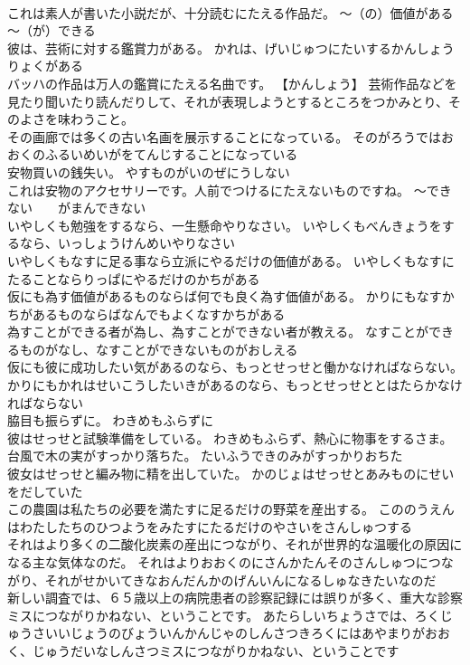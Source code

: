\documentclass[8pt]{extreport}
\begin{document}
\begin{CJK}{UTF8}{min}
\\	これは素人が書いた小説だが、十分読むにたえる作品だ。	～（の）価値がある　　～（が）できる
\\	彼は、芸術に対する鑑賞力がある。	かれは、げいじゅつにたいするかんしょうりょくがある 
\\	バッハの作品は万人の鑑賞にたえる名曲です。	【かんしょう】 芸術作品などを見たり聞いたり読んだりして、それが表現しようとするところをつかみとり、そのよさを味わうこと。
\\	その画廊では多くの古い名画を展示することになっている。	そのがろうではおおくのふるいめいがをてんじすることになっている 
\\	安物買いの銭失い。	やすものがいのぜにうしない 
\\	これは安物のアクセサリーです。人前でつけるにたえないものですね。	～できない　　がまんできない
\\	いやしくも勉強をするなら、一生懸命やりなさい。	いやしくもべんきょうをするなら、いっしょうけんめいやりなさい 
\\	いやしくもなすに足る事なら立派にやるだけの価値がある。	いやしくもなすにたることならりっぱにやるだけのかちがある 
\\	仮にも為す価値があるものならば何でも良く為す価値がある。	かりにもなすかちがあるものならばなんでもよくなすかちがある 
\\	為すことができる者が為し、為すことができない者が教える。	なすことができるものがなし、なすことができないものがおしえる 
\\	仮にも彼に成功したい気があるのなら、もっとせっせと働かなければならない。	かりにもかれはせいこうしたいきがあるのなら、もっとせっせととはたらかなければならない 
\\	脇目も振らずに。	わきめもふらずに 
\\	彼はせっせと試験準備をしている。	わきめもふらず、熱心に物事をするさま。
\\	台風で木の実がすっかり落ちた。	たいふうできのみがすっかりおちた 
\\	彼女はせっせと編み物に精を出していた。	かのじょはせっせとあみものにせいをだしていた 
\\	この農園は私たちの必要を満たすに足るだけの野菜を産出する。	こののうえんはわたしたちのひつようをみたすにたるだけのやさいをさんしゅつする 
\\	それはより多くの二酸化炭素の産出につながり、それが世界的な温暖化の原因になる主な気体なのだ。	それはよりおおくのにさんかたんそのさんしゅつにつながり、それがせかいてきなおんだんかのげんいんになるしゅなきたいなのだ 
\\	新しい調査では、６５歳以上の病院患者の診察記録には誤りが多く、重大な診察ミスにつながりかねない、ということです。	あたらしいちょうさでは、ろくじゅうさいいじょうのびょういんかんじゃのしんさつきろくにはあやまりがおおく、じゅうだいなしんさつミスにつながりかねない、ということです 

\end{CJK}
\end{document}

